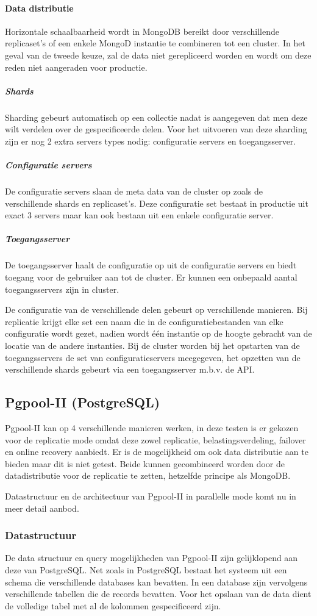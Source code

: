 \paragraph{Data distributie\cite{mongodb-shard}} Horizontale schaalbaarheid wordt in MongoDB bereikt door verschillende replicaset's of een enkele MongoD instantie te combineren tot een cluster. In het geval van de tweede keuze, zal de data niet gerepliceerd worden en wordt om deze reden niet aangeraden voor productie. 
\subparagraph{Shards} Sharding gebeurt automatisch op een collectie nadat is aangegeven dat men deze wilt verdelen over de gespecificeerde delen. Voor het uitvoeren van deze sharding zijn er nog 2 extra servers types nodig: configuratie servers en toegangsserver. 
\subparagraph{Configuratie servers} De configuratie servers slaan de meta data van de cluster op zoals de verschillende shards en replicaset's. Deze configuratie set bestaat in productie uit exact 3 servers maar kan ook bestaan uit een enkele configuratie server.
\subparagraph{Toegangsserver} De toegangsserver haalt de configuratie op uit de configuratie servers en biedt toegang voor de gebruiker aan tot de cluster. Er kunnen een onbepaald aantal toegangsservers zijn in cluster. 

De configuratie van de verschillende delen gebeurt op verschillende manieren. Bij replicatie krijgt elke set een naam die in de configuratiebestanden van elke configuratie wordt gezet, nadien wordt één instantie op de hoogte gebracht van de locatie van de andere instanties. Bij de cluster worden bij het opstarten van de toegangsservers de set van configuratieservers meegegeven, het opzetten van de verschillende shards gebeurt via een toegangsserver m.b.v. de API. 

\subsection{Pgpool-II (PostgreSQL)\cite{pgpool-doc}}
Pgpool-II kan op 4 verschillende manieren werken, in deze testen is er gekozen voor de replicatie mode omdat deze zowel replicatie, belastingsverdeling, failover en online recovery aanbiedt. Er is de mogelijkheid om ook data distributie aan te bieden maar dit is niet getest. Beide kunnen gecombineerd worden door de datadistributie voor de replicatie te zetten, hetzelfde principe als MongoDB. 

Datastructuur en de architectuur van Pgpool-II in parallelle mode komt nu in meer detail aanbod. 

\subsubsection{Datastructuur}
De data structuur en query mogelijkheden van Pgpool-II zijn gelijklopend aan deze van PostgreSQL. Net zoals in PostgreSQL bestaat het systeem uit een schema die verschillende databases kan bevatten. In een database zijn vervolgens verschillende tabellen die de records bevatten. Voor het opslaan van de data dient de volledige tabel met al de kolommen gespecificeerd zijn. 

